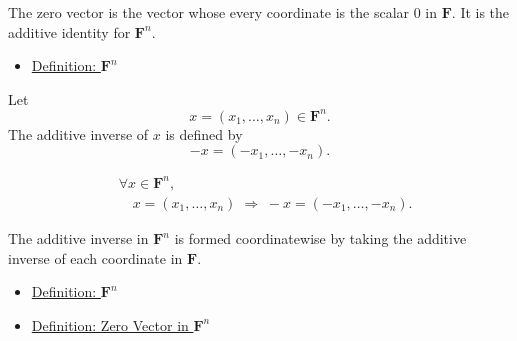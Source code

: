 \begin{remark*}[Interpretation]
The zero vector is the vector whose every coordinate is the scalar $0$ in
$\mathbf{F}$. It is the additive identity for $\mathbf{F}^n$.
\end{remark*}

\begin{remark*}[Dependencies]
\begin{itemize}
  \item \hyperref[def:Fn]{Definition: $\mathbf{F}^n$}
\end{itemize}
\end{remark*}


\begin{tcolorbox}[colback=defbox, colframe=defborder, arc=2pt,
  left=6pt, right=6pt, top=4pt, bottom=4pt,
  title={\small\textbf{Definition (Additive Inverse in $\mathbf{F}^n$)}},
  fonttitle=\small\bfseries]
\begin{definition}
\label{def:additive-inverse-in-Fn}
Let
\[
x=(x_1,\dots,x_n)\in \mathbf{F}^n.
\]
The additive inverse of $x$ is defined by
\[
-x=(-x_1,\dots,-x_n).
\]
\end{definition}
\end{tcolorbox}

\begin{remark*}
\[
\begin{aligned}
&\forall x \in \mathbf{F}^n, \\
&\quad
x=(x_1,\dots,x_n)
\;\Rightarrow\;
-x=(-x_1,\dots,-x_n).
\end{aligned}
\]
\end{remark*}

\begin{remark*}[Interpretation]
The additive inverse in $\mathbf{F}^n$ is formed coordinatewise by taking
the additive inverse of each coordinate in $\mathbf{F}$.
\end{remark*}

\begin{remark*}[Dependencies]
\begin{itemize}
  \item \hyperref[def:Fn]{Definition: $\mathbf{F}^n$}
  \item \hyperref[def:zero-vector-in-Fn]{Definition: Zero Vector in $\mathbf{F}^n$}
\end{itemize}
\end{remark*}

